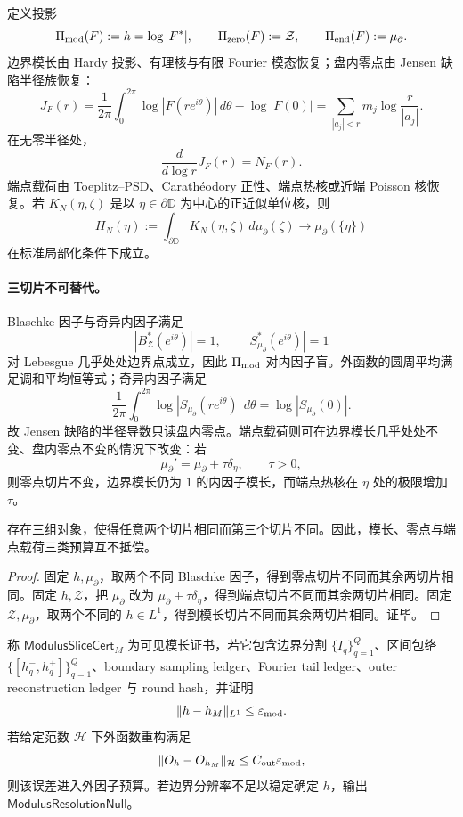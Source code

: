 定义投影
\[
\Pi_{\rm mod}(F):=h=\log|F^*|,
\qquad
\Pi_{\rm zero}(F):=\mathcal Z,
\qquad
\Pi_{\rm end}(F):=\mu_\partial.
\]
边界模长由 Hardy 投影、有理核与有限 Fourier 模态恢复；盘内零点由 Jensen 缺陷半径族恢复：
\[
J_F(r)
=
\frac1{2\pi}
\int_0^{2\pi}\log|F(re^{i\theta})|\,d\theta
-\log|F(0)|
=
\sum_{|a_j|<r}m_j\log\frac r{|a_j|}.
\]
在无零半径处，
\[
\frac{d}{d\log r}J_F(r)=N_F(r).
\]
端点载荷由 Toeplitz--PSD、Carath\'eodory 正性、端点热核或近端 Poisson 核恢复。若 \(K_N(\eta,\zeta)\) 是以 \(\eta\in\partial\mathbb D\) 为中心的正近似单位核，则
\[
H_N(\eta):=\int_{\partial\mathbb D}K_N(\eta,\zeta)\,d\mu_\partial(\zeta)
\longrightarrow
\mu_\partial(\{\eta\})
\]
在标准局部化条件下成立。

\paragraph{三切片不可替代。}
Blaschke 因子与奇异内因子满足
\[
|B_{\mathcal Z}^*(e^{i\theta})|=1,
\qquad
|S_{\mu_\partial}^*(e^{i\theta})|=1
\]
对 Lebesgue 几乎处处边界点成立，因此 \(\Pi_{\rm mod}\) 对内因子盲。外函数的圆周平均满足调和平均恒等式；奇异内因子满足
\[
\frac1{2\pi}\int_0^{2\pi}
\log|S_{\mu_\partial}(re^{i\theta})|\,d\theta
=
\log|S_{\mu_\partial}(0)|.
\]
故 Jensen 缺陷的半径导数只读盘内零点。端点载荷则可在边界模长几乎处处不变、盘内零点不变的情况下改变：若
\[
\mu_\partial'=\mu_\partial+\tau\delta_\eta,
\qquad \tau>0,
\]
则零点切片不变，边界模长仍为 \(1\) 的内因子模长，而端点热核在 \(\eta\) 处的极限增加 \(\tau\)。

\begin{theorem}[三预算不可抵偿]\label{thm:typed-address-biaxial-completion-trislice-budgets-noncompensating}
存在三组对象，使得任意两个切片相同而第三个切片不同。因此，模长、零点与端点载荷三类预算互不抵偿。
\end{theorem}
\begin{proof}
固定 \(h,\mu_\partial\)，取两个不同 Blaschke 因子，得到零点切片不同而其余两切片相同。固定 \(h,\mathcal Z\)，把 \(\mu_\partial\) 改为 \(\mu_\partial+\tau\delta_\eta\)，得到端点切片不同而其余两切片相同。固定 \(\mathcal Z,\mu_\partial\)，取两个不同的 \(h\in L^1\)，得到模长切片不同而其余两切片相同。证毕。
\end{proof}

\begin{definition}[可见模长证书]\label{def:typed-address-biaxial-completion-modulus-slice-cert}
称 \(\mathsf{ModulusSliceCert}_M\) 为可见模长证书，若它包含边界分割 \(\{I_q\}_{q=1}^Q\)、区间包络 \(\{[h_q^-,h_q^+]\}_{q=1}^Q\)、boundary sampling ledger、Fourier tail ledger、outer reconstruction ledger 与 round hash，并证明
\[
\|h-h_M\|_{L^1}\le\varepsilon_{\rm mod}.
\]
若给定范数 \(\mathcal H\) 下外函数重构满足
\[
\|O_h-O_{h_M}\|_{\mathcal H}
\le
C_{\rm out}\varepsilon_{\rm mod},
\]
则该误差进入外因子预算。若边界分辨率不足以稳定确定 \(h\)，输出 \(\mathsf{ModulusResolutionNull}\)。
\end{definition}

